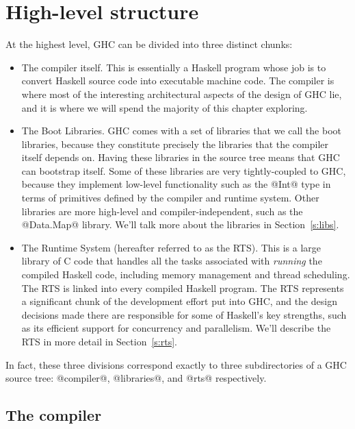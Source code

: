 \documentclass{article}
\begin{document}
\section{High-level structure}

At the highest level, GHC can be divided into three distinct chunks:

\begin{itemize}
\item The compiler itself.  This is essentially a Haskell program
  whose job is to convert Haskell source code into executable machine
  code.  The compiler is where most of the interesting architectural
  aspects of the design of GHC lie, and it is where we will spend the
  majority of this chapter exploring.

\item The Boot Libraries.  GHC comes with a set of libraries that we
  call the boot libraries, because they constitute precisely the
  libraries that the compiler itself depends on.  Having these
  libraries in the source tree means that GHC can bootstrap itself.
  Some of these libraries are very tightly-coupled to GHC, because
  they implement low-level functionality such as the @Int@ type in
  terms of primitives defined by the compiler and runtime system.
  Other libraries are more high-level and compiler-independent, such
  as the @Data.Map@ library.  We'll talk more about the libraries in
  Section~\ref{s:libs}.

\item The Runtime System (hereafter referred to as the RTS).  This is
  a large library of C code that handles all the tasks associated with
  \emph{running} the compiled Haskell code, including memory
  management and thread scheduling.  The RTS is linked into every
  compiled Haskell program.  The RTS represents a significant chunk of
  the development effort put into GHC, and the design decisions made
  there are responsible for some of Haskell's key strengths, such as
  its efficient support for concurrency and parallelism.  We'll
  describe the RTS in more detail in Section~\ref{s:rts}.
\end{itemize}

In fact, these three divisions correspond exactly to three
subdirectories of a GHC source tree: @compiler@, @libraries@, and
@rts@ respectively.

\subsection{The compiler}
\end{document}
